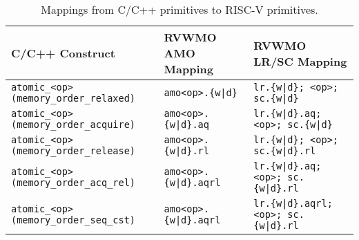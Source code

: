 \begin{table}[h!]
  \footnotesize\centering
  \begin{tabular}{|l|l|l|}
    \hline
    C/C++ Construct                               & RVWMO AMO Mapping       & RVWMO LR/SC Mapping\\
    \hline
    \tt atomic\_<op>(memory\_order\_relaxed)  & \tt amo<op>.\{w|d\}      & \tt lr.\{w|d\}; <op>; sc.\{w|d\} \\
    \hline
    \tt atomic\_<op>(memory\_order\_acquire)  & \tt amo<op>.\{w|d\}.aq   & \tt lr.\{w|d\}.aq; <op>; sc.\{w|d\} \\
    \hline
    \tt atomic\_<op>(memory\_order\_release)  & \tt amo<op>.\{w|d\}.rl   & \tt lr.\{w|d\}; <op>; sc.\{w|d\}.rl \\
    \hline
    \tt atomic\_<op>(memory\_order\_acq\_rel) & \tt amo<op>.\{w|d\}.aqrl & \tt lr.\{w|d\}.aq; <op>; sc.\{w|d\}.rl \\
    \hline
    \tt atomic\_<op>(memory\_order\_seq\_cst) & \tt amo<op>.\{w|d\}.aqrl & \tt lr.\{w|d\}.aqrl; <op>; sc.\{w|d\}.rl \\
    \hline
  \end{tabular}
  \caption{Mappings from C/C++ primitives to RISC-V primitives.}
  \label{tab:c11mappings}
\end{table}

